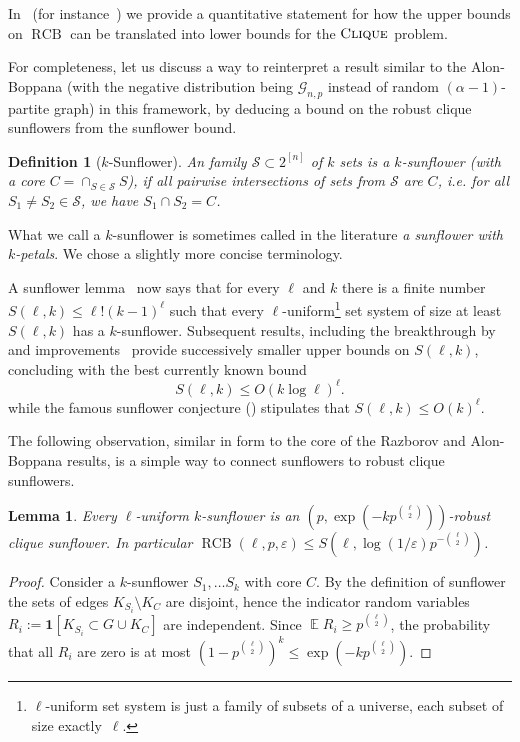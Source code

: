 \documentclass[10pt,a4paper]{article}
\DeclareMathOperator{\E}{\mathbb{E}}
\newcommand{\RCB}{\mathop{RCB}}
\newtheorem{definition}[theorem]{Definition}
\newtheorem{lemma}[theorem]{Lemma}
\newcommand{\cliquep}{\textsc{Clique}}
\begin{document}
In~ (for instance~) we provide a quantitative statement for how the upper bounds on $\RCB$ can be translated into lower bounds for the $\cliquep$ problem. 

For completeness, let us discuss a way to reinterpret a result similar to the Alon-Boppana (with the negative distribution being $\mathcal{G}_{n,p}$ instead of random $(\alpha-1)$-partite graph) in this framework, by deducing a bound on the robust clique sunflowers from the sunflower bound.

\begin{definition}[$k$-Sunflower]
    An family $\mathcal{S} \subset 2^{[n]}$ of $k$ sets is a $k$-sunflower (with a core $C = \cap_{S \in \mathcal{S}} S$), if all pairwise intersections of sets from $\mathcal{S}$ are $C$, i.e. for all $S_1 \not= S_2 \in \mathcal{S}$, we have $S_1 \cap S_2 = C$.
\end{definition}

What we call a $k$-sunflower is sometimes called in the literature \emph{a sunflower with $k$-petals}. We chose a slightly more concise terminology.

A sunflower lemma~\cite{erdos60} now says that for every $\ell$ and $k$ there is a finite number $S(\ell, k) \leq \ell! (k-1)^\ell$ such that every $\ell$-uniform\footnote{$\ell$-uniform set system is just a family of subsets of a universe, each subset of size exactly~$\ell$.} set system of size at least $S(\ell, k)$ has a $k$-sunflower. Subsequent results, including the breakthrough by~\cite{alweiss20} and improvements~\cite{bell2021note,Rao2020Coding,Tao2020sunflower, Hu2021sunflower, rao2023sunflowers} provide successively smaller upper bounds on $S(\ell, k)$, concluding with the best currently known bound
\begin{equation}
\label{eq:new-sunflower-numbers}
    S(\ell, k) \leq O(k \log \ell)^{\ell}.
\end{equation}
while the famous sunflower conjecture (\cite{erdos60}) stipulates that $S(\ell, k) \leq O(k)^\ell$.

The following observation, similar in form to the core of the Razborov and Alon-Boppana results, is a simple way to connect sunflowers to robust clique sunflowers.
\begin{lemma}
\label{lem:sunflower-is-clique-sunflower}
    Every $\ell$-uniform $k$-sunflower is an $(p, \exp(-k p^{\binom{\ell}{2}}))$-robust clique sunflower. In particular
    $\RCB(\ell, p, \varepsilon) \leq S(\ell, \log(1/\varepsilon) p^{-\binom{\ell}{2}})$.
\end{lemma}
\begin{proof}
    Consider a $k$-sunflower $S_1, \ldots S_k$ with core $C$. By the definition of sunflower the sets of edges $K_{S_i} \setminus K_{C}$ are disjoint, hence the indicator random variables
    $R_i := \mathbf{1}[K_{S_i} \subset G \cup K_C]$ are independent. Since $\E R_i \geq p^{\binom{\ell}{2}}$, the probability that all $R_i$ are zero is at most $(1 - p^{\binom{\ell}{2}})^k \leq \exp(-k p^{\binom{\ell}{2}})$.
\end{proof}
\end{document}

